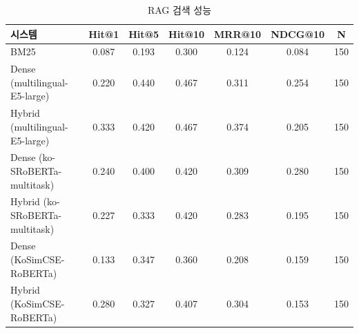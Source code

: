 \usepackage{booktabs}
\usepackage{graphicx}

\begin{table}[ht]
\centering
\caption{NER 개체명 인식 성능 (Entity-level Span F1)}
\label{tab:ner}
\end{table}

\begin{table}[ht]
\centering
\caption{RAG 검색 성능}
\label{tab:rag}
\begin{tabular}{lcccccc}
\toprule
시스템 & Hit@1 & Hit@5 & Hit@10 & MRR@10 & NDCG@10 & N \\
\midrule
BM25 & 0.087 & 0.193 & 0.300 & 0.124 & 0.084 & 150 \\
Dense (multilingual-E5-large) & 0.220 & 0.440 & 0.467 & 0.311 & 0.254 & 150 \\
Hybrid (multilingual-E5-large) & 0.333 & 0.420 & 0.467 & 0.374 & 0.205 & 150 \\
Dense (ko-SRoBERTa-multitask) & 0.240 & 0.400 & 0.420 & 0.309 & 0.280 & 150 \\
Hybrid (ko-SRoBERTa-multitask) & 0.227 & 0.333 & 0.420 & 0.283 & 0.195 & 150 \\
Dense (KoSimCSE-RoBERTa) & 0.133 & 0.347 & 0.360 & 0.208 & 0.159 & 150 \\
Hybrid (KoSimCSE-RoBERTa) & 0.280 & 0.327 & 0.407 & 0.304 & 0.153 & 150 \\
\bottomrule
\end{tabular}
\end{table}

